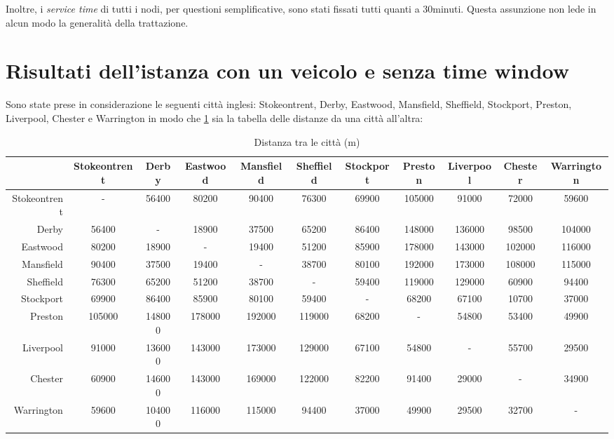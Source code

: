		Inoltre, i \emph{service time} di tutti i nodi, per questioni semplificative, sono stati fissati tutti quanti a 30minuti. Questa assunzione non lede in alcun modo la generalità della trattazione.

	\section{Risultati dell’istanza con un veicolo e senza time window}
	\label{sec:istanza_singolo_veicolo_no_time_window}
		Sono state prese in considerazione le seguenti città inglesi: Stokeontrent,	Derby, Eastwood, Mansfield,	Sheffield, Stockport, Preston, Liverpool, Chester e Warrington in modo che \ref{table:distanza_citta} sia la tabella delle distanze da una città all’altra:

		\begin{table}[]
			\centering
			\caption{Distanza tra le città (m)}
			\label{table:distanza_citta}
			\begin{tabular}{@{}rcccccccccc@{}}
				\toprule
				                                  & Stokeontrent & Derby  & Eastwood & Mansfield & Sheffield & Stockport & Preston & Liverpool & Chester & Warrington \\ \midrule
				\multicolumn{1}{r|}{Stokeontrent} & -            & 56400  & 80200    & 90400     & 76300     & 69900     & 105000  & 91000     & 72000   & 59600      \\
				\multicolumn{1}{r|}{Derby}        & 56400        & -      & 18900    & 37500     & 65200     & 86400     & 148000  & 136000    & 98500   & 104000     \\
				\multicolumn{1}{r|}{Eastwood}     & 80200        & 18900  & -        & 19400     & 51200     & 85900     & 178000  & 143000    & 102000  & 116000     \\
				\multicolumn{1}{r|}{Mansfield}    & 90400        & 37500  & 19400    & -         & 38700     & 80100     & 192000  & 173000    & 108000  & 115000     \\
				\multicolumn{1}{r|}{Sheffield}    & 76300        & 65200  & 51200    & 38700     & -         & 59400     & 119000  & 129000    & 60900   & 94400      \\
				\multicolumn{1}{r|}{Stockport}    & 69900        & 86400  & 85900    & 80100     & 59400     & -         & 68200   & 67100     & 10700   & 37000      \\
				\multicolumn{1}{r|}{Preston}      & 105000       & 148000 & 178000   & 192000    & 119000    & 68200     & -       & 54800     & 53400   & 49900      \\
				\multicolumn{1}{r|}{Liverpool}    & 91000        & 136000 & 143000   & 173000    & 129000    & 67100     & 54800   & -         & 55700   & 29500      \\
				\multicolumn{1}{r|}{Chester}      & 60900        & 146000 & 143000   & 169000    & 122000    & 82200     & 91400   & 29000     & -       & 34900      \\
				\multicolumn{1}{r|}{Warrington}   & 59600        & 104000 & 116000   & 115000    & 94400     & 37000     & 49900   & 29500     & 32700   & -          \\ \bottomrule
			\end{tabular}
		\end{table}
		